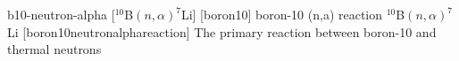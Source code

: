 \newglsXreaction%
{b10-neutron-alpha}%
[{}$^{10}$B$(n,\alpha)^7$Li]%
[boron10]%
{boron-10 (n,a) reaction}%
{{}$^{10}$B$(n,\alpha)^7$Li}%
[boron10neutronalphareaction]%
{The primary reaction between boron-10 and thermal neutrons}%